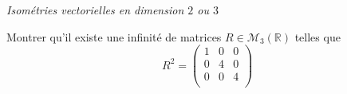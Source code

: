 \documentclass[a4paper,10pt]{report}
\begin{document}


\newpage

\begin{center}
\textit{{ {\large Isométries vectorielles en dimension $2$ ou $3$}}}
\end{center}

\medskip

\begin{Exercice}{} Montrer qu'il existe une infinité de matrices $R \in \mathcal{M}_3(\mathbb{R})$ telles que
$$  R^2 = \begin{pmatrix}
1 & 0 & 0 \\
0 & 4 & 0 \\
0 & 0 & 4 \\
\end{pmatrix}$$
\end{Exercice}

\end{document}
